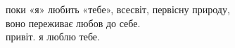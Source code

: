 поки «я» любить «тебе», всесвіт, первісну природу,\\
воно переживає любов до себе.\\

привіт. я люблю тебе.

